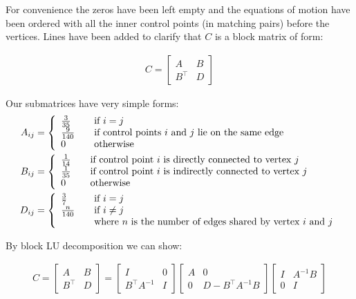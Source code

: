\documentclass{article}
\begin{document}
For convenience the zeros have been left empty and the equations of motion have been ordered 
with all the inner control points (in matching pairs) before the vertices. Lines have been 
added to clarify that $C$ is a block matrix of form:

\begin{align*}
C=\left[
\begin{array}{c|c}
A & B \\ \hline
B^{\top} & D
\end{array}\right]
\end{align*}

Our submatrices have very simple forms:
\begin{align*}
A_{ij} &= \left\{ 
  \begin{array}{l l}
    \frac{3}{35} & \quad \text{if $i=j$}\\
    \frac{9}{140} & \quad \text{if control points $i$ and $j$ lie on the same edge}\\
    0 & \quad \text{otherwise}\\
  \end{array} \right.\\
B_{ij} &= \left\{ 
  \begin{array}{l l}
    \frac{1}{14} & \quad \text{if control point $i$ is directly connected to vertex $j$}\\
    \frac{1}{35} & \quad \text{if control point $i$ is indirectly connected to vertex $j$}\\
    0 & \quad \text{otherwise}\\
  \end{array} \right.  \\ 
D_{ij} &= \left\{ 
  \begin{array}{l l}
    \frac{3}{7} & \quad \text{if $i=j$}\\
    \frac{n}{140} & \quad \text{if $i\neq j$}\\
    & \quad \text{where $n$ is the number of edges shared by vertex $i$ and $j$}
  \end{array} \right.
\end{align*}

By block LU decomposition we can show:

\begin{align*}
C=
\begin{bmatrix} 
A & B \\ 
B^{\top} & D
\end{bmatrix} 
=
\begin{bmatrix} 
I & 0 \\ 
B^{\top}A^{-1} & I
\end{bmatrix}   
\begin{bmatrix} 
A & 0 \\ 
0 & D - B^{\top}A^{-1}B
\end{bmatrix}   
\begin{bmatrix} 
I & A^{-1}B \\ 
0 & I
\end{bmatrix}   
\end{align*}
 
\end{document}
